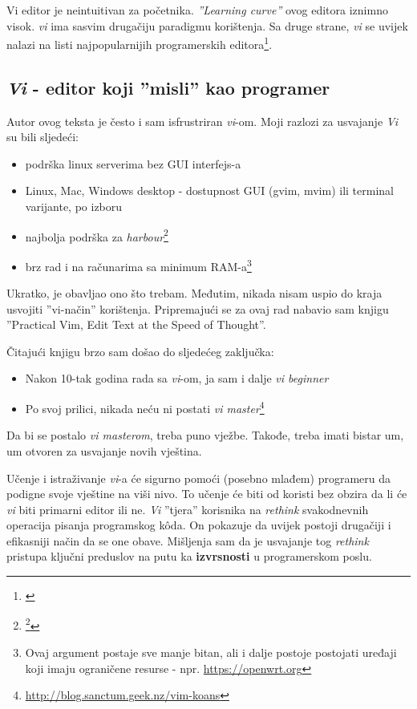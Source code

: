 \documentclass[times, utf8, seminar]{fit}
\begin{document}
Vi editor je neintuitivan za početnika. \emph{''Learning curve''} ovog editora iznimno visok. \emph{vi} ima sasvim drugačiju paradigmu korištenja. Sa druge strane, \emph{vi} se uvijek nalazi na listi najpopularnijih programerskih editora\footnote{\href{http://tutorialzine.com/2012/07/battle-of-the-tools-which-is-the-best-code-editor}{\color{blue}{Pregled programerskih editora}}}.

\subsection{\emph{Vi} - editor koji ''misli'' kao programer}

\label{sec:vimaster}

Autor ovog teksta je često i sam isfrustriran \emph{vi}-om. Moji razlozi za usvajanje \emph{Vi} su bili sljedeći:
\begin{itemize}
 \item podrška linux serverima bez GUI interfejs-a
 \item Linux, Mac, Windows desktop - dostupnost GUI (gvim, mvim) ili terminal varijante, po izboru 
 \item najbolja podrška za \emph{harbour}\footnote{\footnote{http://en.wikipedia.org/wiki/Harbour_(software)}}
 \item brz rad i na računarima sa minimum RAM-a\footnote{Ovaj argument postaje sve manje bitan, ali i dalje postoje postojati uređaji koji imaju ograničene resurse - npr. \url{https://openwrt.org}}
\end{itemize}

Ukratko,  je obavljao ono što trebam. Međutim, nikada nisam uspio do kraja usvojiti ''vi-način'' korištenja. Pripremajući se za ovaj rad nabavio sam knjigu ''Practical Vim, Edit Text at the Speed of Thought''\citep{pragvim}.

Čitajući knjigu brzo sam došao do sljedećeg zaključka:
\begin{itemize}
  \item Nakon 10-tak godina rada sa \emph{vi}-om, ja sam i dalje \emph{vi beginner} 
  \item Po svoj prilici, nikada neću ni postati \emph{vi master}\footnote{\url{http://blog.sanctum.geek.nz/vim-koans}}
\end{itemize}

Da bi se postalo \emph{vi masterom}, treba puno vježbe. Takođe, treba imati bistar um, um otvoren za usvajanje novih vještina. 

Učenje i istraživanje \emph{vi}-a će sigurno pomoći (posebno mlađem) programeru da podigne svoje vještine na viši nivo. To učenje će biti od koristi bez obzira da li će \emph{vi} biti primarni editor ili ne. \emph{Vi} ''tjera'' korisnika na \emph{rethink} svakodnevnih operacija pisanja programskog k\^oda. On pokazuje da uvijek postoji drugačiji i efikasniji način da se one obave. Mišljenja sam da je usvajanje tog \emph{rethink} pristupa ključni preduslov na putu ka \textbf{izvrsnosti} u programerskom poslu.
\end{document}
